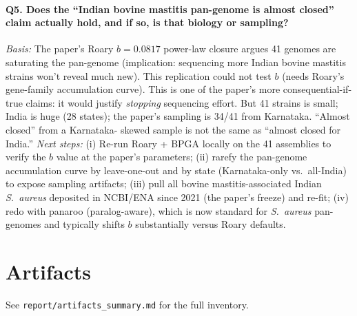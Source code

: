 \documentclass[11pt]{article}
\begin{document}
\paragraph{Q5. Does the ``Indian bovine mastitis pan-genome is almost
closed'' claim actually hold, and if so, is that biology or sampling?}
\emph{Basis:} The paper's Roary $b=0.0817$ power-law closure argues 41
genomes are saturating the pan-genome (implication: sequencing more Indian
bovine mastitis strains won't reveal much new). This replication could not
test $b$ (needs Roary's gene-family accumulation curve). This is one of the
paper's more consequential-if-true claims: it would justify \emph{stopping}
sequencing effort. But 41 strains is small; India is huge (28 states); the
paper's sampling is 34/41 from Karnataka. ``Almost closed'' from a Karnataka-
skewed sample is not the same as ``almost closed for India.''
\emph{Next steps:} (i) Re-run Roary + BPGA locally on the 41 assemblies to
verify the $b$ value at the paper's parameters; (ii) rarefy the pan-genome
accumulation curve by leave-one-out and by state (Karnataka-only vs.\
all-India) to expose sampling artifacts; (iii) pull all bovine
mastitis-associated Indian \emph{S.\ aureus} deposited in NCBI/ENA since
2021 (the paper's freeze) and re-fit; (iv) redo with panaroo (paralog-aware),
which is now standard for \emph{S.\ aureus} pan-genomes and typically shifts
$b$ substantially versus Roary defaults.

\section{Artifacts}
See \texttt{report/artifacts\_summary.md} for the full inventory.
\end{document}
